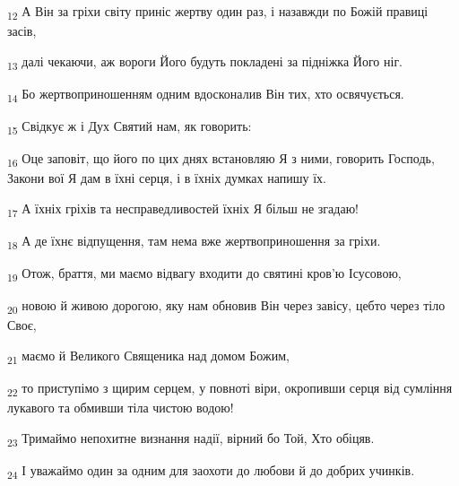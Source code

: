 \begin{tcolorbox}
\textsubscript{12} А Він за гріхи світу приніс жертву один раз, і назавжди по Божій правиці засів,
\end{tcolorbox}
\begin{tcolorbox}
\textsubscript{13} далі чекаючи, аж вороги Його будуть покладені за підніжка Його ніг.
\end{tcolorbox}
\begin{tcolorbox}
\textsubscript{14} Бо жертвоприношенням одним вдосконалив Він тих, хто освячується.
\end{tcolorbox}
\begin{tcolorbox}
\textsubscript{15} Свідкує ж і Дух Святий нам, як говорить:
\end{tcolorbox}
\begin{tcolorbox}
\textsubscript{16} Оце заповіт, що його по цих днях встановляю Я з ними, говорить Господь, Закони вої Я дам в їхні серця, і в їхніх думках напишу їх.
\end{tcolorbox}
\begin{tcolorbox}
\textsubscript{17} А їхніх гріхів та несправедливостей їхніх Я більш не згадаю!
\end{tcolorbox}
\begin{tcolorbox}
\textsubscript{18} А де їхнє відпущення, там нема вже жертвоприношення за гріхи.
\end{tcolorbox}
\begin{tcolorbox}
\textsubscript{19} Отож, браття, ми маємо відвагу входити до святині кров'ю Ісусовою,
\end{tcolorbox}
\begin{tcolorbox}
\textsubscript{20} новою й живою дорогою, яку нам обновив Він через завісу, цебто через тіло Своє,
\end{tcolorbox}
\begin{tcolorbox}
\textsubscript{21} маємо й Великого Священика над домом Божим,
\end{tcolorbox}
\begin{tcolorbox}
\textsubscript{22} то приступімо з щирим серцем, у повноті віри, окропивши серця від сумління лукавого та обмивши тіла чистою водою!
\end{tcolorbox}
\begin{tcolorbox}
\textsubscript{23} Тримаймо непохитне визнання надії, вірний бо Той, Хто обіцяв.
\end{tcolorbox}
\begin{tcolorbox}
\textsubscript{24} І уважаймо один за одним для заохоти до любови й до добрих учинків.
\end{tcolorbox}

